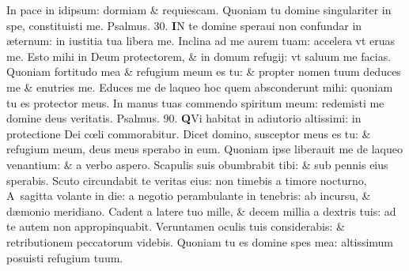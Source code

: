 \documentclass[a5paper,10pt]{book}
\def\ae{æ}
\def\oe{œ}
\begin{document}
\begin{multicols*}{2}
\newline \color{red} I\color{black}n pace in idipsum: dormiam \& requiescam.
\newline \color{red} Q\color{black}uoniam tu domine singulariter in spe, constituisti me. \quad \color{red} Psalmus. \hypertarget{ps30.1}{30.} \color{black}
\lettrine[lines=2]{\bfseries \color{red} I}{}N te domine speraui non confundar in \ae ternum: in iustitia tua libera me.
\newline \color{red} I\color{black}nclina ad me aurem tuam: accelera vt eruas me.
\newline \color{red} E\color{black}sto mihi in Deum protectorem, \& in domum refugij: vt saluum me facias.
\newline \color{red} Q\color{black}uoniam fortitudo mea \& refugium meum es tu: \& propter nomen tuum deduces me \& enutries me.
\newline \color{red} E\color{black}duces me de laqueo hoc quem absconderunt mihi: quoniam tu es protector meus.
\newline \color{red} I\color{black}n manus tuas commendo spiritum meum: redemisti me domine deus veritatis. \quad \color{red} Psalmus. \hypertarget{ps90}{90.} \color{black}
\lettrine[lines=2]{\bfseries \color{red} Q}{}Vi habitat in adiutorio altissimi: in protectione Dei c\oe li commorabitur.
\newline \color{red} D\color{black}icet domino, susceptor meus es tu: \& refugium meum, deus meus sperabo in eum.
\newline \color{red} Q\color{black}uoniam ipse liberauit me de laqueo venantium: \& a verbo aspero.
\newline \color{red} S\color{black}capulis suis obumbrabit tibi: \& sub pennis eius sperabis.
\newline \color{red} S\color{black}cuto circundabit te veritas eius: non timebis a timore nocturno,
\newline \color{red} A\color{black}\ sagitta volante in die: a negotio perambulante in tenebris: ab incursu, \& d\ae monio meridiano.
\newline \color{red} C\color{black}adent a latere tuo mille, \& decem millia a dextris tuis: ad te autem non appropinquabit.
\newline \color{red} V\color{black}eruntamen oculis tuis considerabis: \& retributionem peccatorum videbis.
\newline \color{red} Q\color{black}uoniam tu es domine spes mea: altissimum posuisti refugium tuum.

\end{multicols*}
\end{document}
